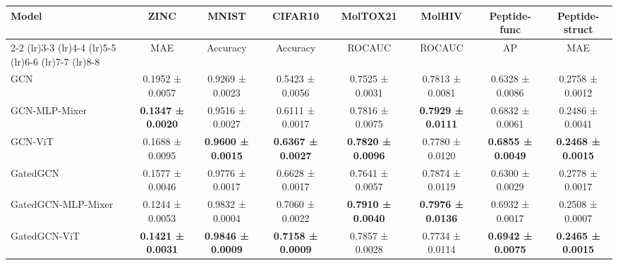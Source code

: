 \documentclass{article}
\begin{document}
\begin{table*}[t]
\scriptsize
    \centering
    \caption{Comparison with base MP-GNNs. Results are averaged over 4 runs with 4 different seeds.}
     \label{tab: performance}
    \begin{tabular}{lccccccc}
    \toprule
         \multirow{2}{*}{Model} 
         &  ZINC  
         & MNIST  
         & CIFAR10  
         & MolTOX21  
         & MolHIV  
         & {Peptide-func} 
         & {Peptide-struct} 
         \\ 
         \cmidrule(lr){2-2}
         \cmidrule(lr){3-3}
         \cmidrule(lr){4-4}
         \cmidrule(lr){5-5}
         \cmidrule(lr){6-6}
         \cmidrule(lr){7-7}
         \cmidrule(lr){8-8}
         & MAE  
         & Accuracy  
         & Accuracy 
         & ROCAUC  
         & ROCAUC  
         & {AP }  
         & {MAE }\\
    \midrule
    GCN 
    & 0.1952 ± 0.0057 & 0.9269 ± 0.0023 & 0.5423 ± 0.0056 & 0.7525 ± 0.0031 & 0.7813 ± 0.0081 & 0.6328 ± 0.0086 & 0.2758 ± 0.0012 \\
    

    {GCN-MLP-Mixer} 
    & {\bf {0.1347 ± 0.0020}} & {{0.9516 ± 0.0027}}          & {{0.6111 ± 0.0017}}           & {{0.7816 ± 0.0075}}          & {\bf{0.7929 ± 0.0111}}           & {{0.6832 ± 0.0061}}          & {{0.2486 ± 0.0041}}           \\

    {GCN-ViT} 
    & {0.1688 ± 0.0095}    & \bf{0.9600 ± 0.0015}    & \bf{0.6367 ± 0.0027}    & \bf{0.7820 ± 0.0096}    & {0.7780 ± 0.0120}    & \bf{0.6855 ± 0.0049}    & \bf{0.2468 ± 0.0015}    \\
    \midrule
    GatedGCN 
    & 0.1577 ± 0.0046 & 0.9776 ± 0.0017 & 0.6628 ± 0.0017 & 0.7641 ± 0.0057 & 0.7874 ± 0.0119 & 0.6300 ± 0.0029 & 0.2778 ± 0.0017 \\
   
    
    {GatedGCN-MLP-Mixer}
    & {{0.1244 ± 0.0053}} & {{0.9832 ± 0.0004}}          & {{0.7060 ± 0.0022}}           & {\bf{0.7910 ± 0.0040}}          & {\bf{0.7976 ± 0.0136}}           & {{0.6932 ± 0.0017}}          & {{0.2508 ± 0.0007}}           \\
    
    {GatedGCN-ViT} 
    & \bf{0.1421 ± 0.0031}    & \bf{0.9846 ± 0.0009}    & \bf{0.7158 ± 0.0009}    & {0.7857 ± 0.0028}    & {0.7734 ± 0.0114}    & \bf{0.6942 ± 0.0075}    & \bf{0.2465 ± 0.0015}    \\
    \midrule
    

\end{tabular}
\end{table*}
\end{document}

